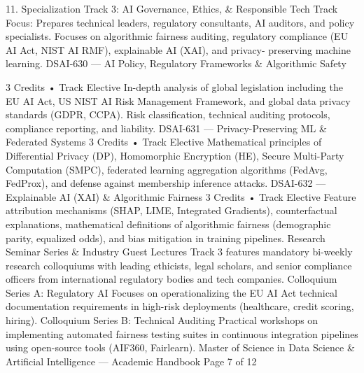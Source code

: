 11. Specialization Track 3: AI Governance, Ethics, \& Responsible Tech
Track Focus: Prepares technical leaders, regulatory consultants, AI auditors, and policy specialists. Focuses on
algorithmic fairness auditing, regulatory compliance (EU AI Act, NIST AI RMF), explainable AI (XAI), and privacy-
preserving machine learning.
DSAI-630 — AI Policy, Regulatory Frameworks \& Algorithmic Safety

3 Credits • Track Elective
In-depth analysis of global legislation including the EU AI Act, US NIST AI Risk Management Framework, and
global data privacy standards (GDPR, CCPA). Risk classification, technical auditing protocols, compliance
reporting, and liability.
DSAI-631 — Privacy-Preserving ML \& Federated Systems
3 Credits • Track Elective
Mathematical principles of Differential Privacy (DP), Homomorphic Encryption (HE), Secure Multi-Party
Computation (SMPC), federated learning aggregation algorithms (FedAvg, FedProx), and defense against
membership inference attacks.
DSAI-632 — Explainable AI (XAI) \& Algorithmic Fairness
3 Credits • Track Elective
Feature attribution mechanisms (SHAP, LIME, Integrated Gradients), counterfactual explanations, mathematical
definitions of algorithmic fairness (demographic parity, equalized odds), and bias mitigation in training pipelines.
Research Seminar Series \& Industry Guest Lectures
Track 3 features mandatory bi-weekly research colloquiums with leading ethicists, legal scholars, and senior
compliance officers from international regulatory bodies and tech companies.
Colloquium Series A: Regulatory AI
Focuses on operationalizing the EU AI Act technical
documentation requirements in high-risk deployments
(healthcare, credit scoring, hiring).
Colloquium Series B: Technical Auditing
Practical workshops on implementing automated fairness
testing suites in continuous integration pipelines using
open-source tools (AIF360, Fairlearn).
Master of Science in Data Science \& Artificial Intelligence — Academic Handbook
Page 7 of 12

